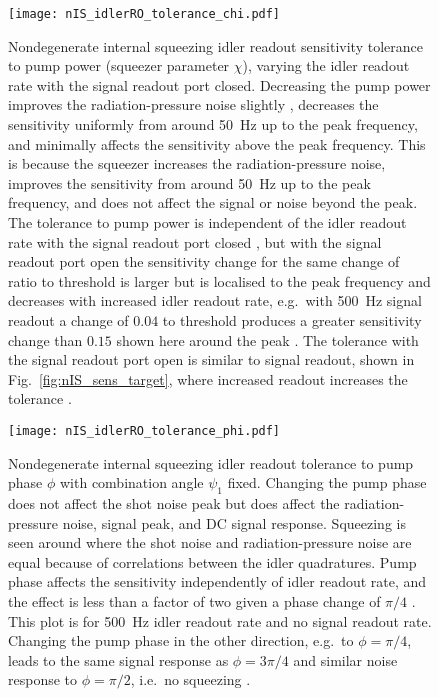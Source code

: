 \begin{figure}
	\centering
	\texttt{[image: nIS\_idlerRO\_tolerance\_chi.pdf]}
	\caption{  Nondegenerate internal squeezing idler readout sensitivity tolerance to pump power (squeezer parameter $\chi$), varying the idler readout rate with the signal readout port closed. Decreasing the pump power improves the radiation-pressure noise slightly , decreases the sensitivity uniformly from around 50~Hz up to the peak frequency, and minimally affects the sensitivity above the peak frequency. This is because the squeezer increases the radiation-pressure noise, improves the sensitivity from around 50~Hz up to the peak frequency, and does not affect the signal or noise beyond the peak. The tolerance to pump power is independent of the idler readout rate with the signal readout port closed , but with the signal readout port open the sensitivity change for the same change of ratio to threshold is larger but is localised to the peak frequency and decreases with increased idler readout rate, e.g.\ with 500~Hz signal readout a change of $0.04$ to threshold produces a greater sensitivity change than $0.15$ shown here around the peak .
    The tolerance with the signal readout port open is similar to signal readout, shown in Fig.~\ref{fig:nIS_sens_target}, where increased readout increases the tolerance .}
	\label{fig:nIS_idlerRO_tolerance_chi}
\end{figure}
\begin{figure}
    \centering
    \texttt{[image: nIS\_idlerRO\_tolerance\_phi.pdf]}
    \caption{  Nondegenerate internal squeezing idler readout tolerance to pump phase $\phi$ with combination angle $\psi_1$ fixed. Changing the pump phase does not affect the shot noise peak but does affect the radiation-pressure noise, signal peak, and DC signal response. Squeezing is seen around where the shot noise and radiation-pressure noise are equal  because of correlations between the idler quadratures. Pump phase affects the sensitivity independently of idler readout rate, and the effect is less than a factor of two given a phase change of $\pi/4$ . This plot is for 500~Hz idler readout rate and no signal readout rate. Changing the pump phase in the other direction, e.g.\ to $\phi=\pi/4$, leads to the same signal response as $\phi=3\pi/4$ and similar noise response to $\phi=\pi/2$, i.e.\ no squeezing .}
    \label{fig:nIS_idlerRO_tolerance_phi}
\end{figure}

